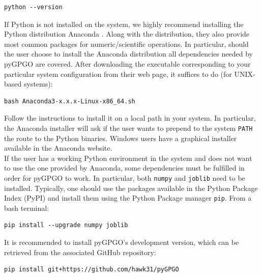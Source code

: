 \documentclass[10pt,a4paper,twoside]{book}
\begin{document}
\begin{verbatim}
python --version   
\end{verbatim}

If Python is not installed on the system, we highly recommend installing the Python distribution Anaconda \cite{ContinuumAnalytics2016}. Along with the distribution, they also provide most common packages for numeric/scientific operations. In particular, should the user choose to install the Anaconda distribution all dependencies needed by pyGPGO are covered. After downloading the executable corresponding to your particular system configuration from their web page, it suffices to do (for UNIX-based systems):

\begin{verbatim}
bash Anaconda3-x.x.x-Linux-x86_64.sh
\end{verbatim}

Follow the instructions to install it on a local path in your system. In particular, the Anaconda installer will ask if the user wants to prepend to the system \texttt{PATH} the route to the Python binaries. Windows users have a graphical installer available in the Anaconda website.\\

If the user has a working Python environment in the system and does not want to use the one provided by Anaconda, some dependencies must be fulfilled in order for pyGPGO to work. In particular, both \texttt{numpy} and \texttt{joblib} need to be installed. Typically, one should use the packages available in the Python Package Index (PyPI) and install them using the Python Package manager \texttt{pip}. From a bash terminal:

\begin{verbatim}
pip install --upgrade numpy joblib            
\end{verbatim}


It is recommended to install pyGPGO's development version, which can be retrieved from the associated GitHub repository:

\begin{verbatim}
pip install git+https://github.com/hawk31/pyGPGO          
\end{verbatim}
\end{document}
